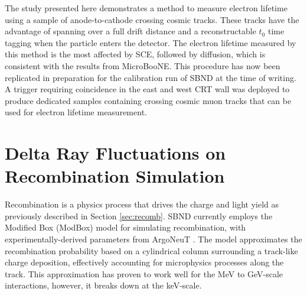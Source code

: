 The study presented here demonstrates a method to measure electron lifetime using a sample of anode-to-cathode crossing cosmic tracks.
These tracks have the advantage of spanning over a full drift distance and a reconstructable $t_{0}$ time tagging when the particle enters the detector.
The electron lifetime measured by this method is the most affected by SCE, followed by diffusion, which is consistent with the results from MicroBooNE.
This procedure has now been replicated in preparation for the calibration run of SBND at the time of writing.
A trigger requiring coincidence in the east and west CRT wall was deployed to produce dedicated samples containing crossing cosmic muon tracks that can be used for electron lifetime measurement.


\section{Delta Ray Fluctuations on Recombination Simulation}
\label{sec7:delta}


Recombination is a physics process that drives the charge and light yield as previously described in Section \ref{sec:recomb}.
SBND currently employs the Modified Box (ModBox) model for simulating recombination, with experimentally-derived parameters from ArgoNeuT \cite{argoneut_recomb}.
The model approximates the recombination probability based on a cylindrical column surrounding a track-like charge deposition, effectively accounting for microphysics processes along the track.
This approximation has proven to work well for the MeV to GeV-scale interactions, however, it breaks down at the keV-scale.


